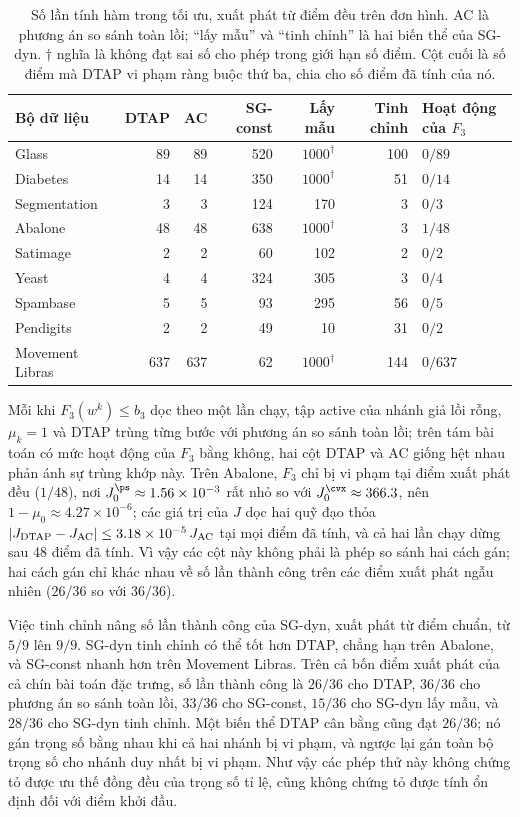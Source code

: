 \begin{table}[t]
\centering\small
\setlength{\tabcolsep}{4pt}
\caption{Số lần tính hàm trong tối ưu, xuất phát từ điểm đều trên đơn hình.
AC là phương án so sánh toàn lồi; ``lấy mẫu'' và ``tinh chỉnh'' là hai biến thể của SG-dyn.
$\dagger$ nghĩa là không đạt sai số cho phép trong giới hạn số điểm.
Cột cuối là số điểm mà DTAP vi phạm ràng buộc thứ ba, chia cho
số điểm đã tính của nó.}
\label{tab:activation-tuning}
\begin{tabular}{@{}lrrrrrl@{}}
\toprule
Bộ dữ liệu & DTAP & AC & SG-const & Lấy mẫu & Tinh chỉnh & Hoạt động của $F_3$\\
\midrule
Glass        & 89 & 89 & 520 & $1000^\dagger$ & 100 & $0/89$\\
Diabetes     & 14 & 14 & 350 & $1000^\dagger$ & 51 & $0/14$\\
Segmentation & 3 & 3 & 124 & 170 & 3 & $0/3$\\
Abalone      & 48 & 48 & 638 & $1000^\dagger$ & 3 & $1/48$\\
Satimage     & 2 & 2 & 60 & 102 & 2 & $0/2$\\
Yeast        & 4 & 4 & 324 & 305 & 3 & $0/4$\\
Spambase     & 5 & 5 & 93 & 295 & 56 & $0/5$\\
Pendigits    & 2 & 2 & 49 & 10 & 31 & $0/2$\\
\midrule
Movement Libras & 637 & 637 & 62 & $1000^\dagger$ & 144 & $0/637$\\
\bottomrule
\end{tabular}
\end{table}

Mỗi khi $F_3(w^k)\le b_3$ dọc theo một lần chạy, tập active của nhánh giả lồi rỗng,
$\mu_k=1$ và DTAP trùng từng bước với phương án so sánh toàn lồi;
trên tám bài toán có mức hoạt động của $F_3$ bằng không, hai cột DTAP và AC giống hệt nhau
phản ánh sự trùng khớp này. Trên Abalone, $F_3$ chỉ bị vi phạm tại điểm xuất phát
đều ($1/48$), nơi $J^{\ps}_0\approx1.56\times10^{-3}$ rất nhỏ so với
$J^{\cvx}_0\approx366.3$, nên $1-\mu_0\approx4.27\times10^{-6}$; các giá trị của $J$
dọc hai quỹ đạo thỏa $|J_{\rm DTAP}-J_{\rm AC}|\le3.18\times10^{-5}\,J_{\rm AC}$ tại
mọi điểm đã tính,
và cả hai lần chạy dừng sau $48$ điểm đã tính. Vì vậy các cột này
không phải là phép so sánh hai cách gán; hai cách gán chỉ khác nhau về số lần thành công
trên các điểm xuất phát ngẫu nhiên ($26/36$ so với $36/36$).

Việc tinh chỉnh nâng số lần thành công của SG-dyn, xuất phát từ điểm chuẩn, từ $5/9$ lên $9/9$.
SG-dyn tinh chỉnh có thể tốt hơn DTAP, chẳng hạn trên Abalone, và SG-const nhanh hơn
trên Movement Libras. Trên cả bốn điểm xuất phát của cả chín bài toán đặc trưng,
số lần thành công là $26/36$ cho DTAP, $36/36$ cho phương án so sánh toàn lồi,
$33/36$ cho SG-const, $15/36$ cho SG-dyn lấy mẫu, và $28/36$
cho SG-dyn tinh chỉnh. Một biến thể DTAP cân bằng cũng đạt $26/36$; nó gán
trọng số bằng nhau khi cả hai nhánh bị vi phạm, và ngược lại gán toàn bộ trọng số cho nhánh duy nhất bị vi phạm.
Như vậy các phép thử này không chứng tỏ được ưu thế đồng đều của trọng số tỉ lệ,
cũng không chứng tỏ được tính ổn định đối với điểm khởi đầu.

